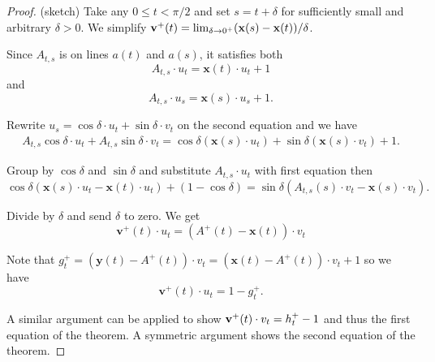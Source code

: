 \begin{proof} (sketch)
Take any $0 \leq t < \pi / 2$ and set $s = t + \delta$ for sufficiently small and arbitrary $\delta > 0$. We simplify $\mathbf{v}^+(t) = \lim_{\delta \rightarrow 0^+}(\mathbf{x}(s) - \mathbf{x}(t)) / \delta$.
	
Since $A_{t, s}$ is on lines $a(t)$ and $a(s)$, it satisfies both 
	$$A_{t, s} \cdot u_t = \mathbf{x}(t) \cdot u_t + 1$$ 
and 
	$$A_{t, s} \cdot u_s = \mathbf{x}(s) \cdot u_s + 1.$$
		
	Rewrite $u_s = \cos \delta \cdot u_t + \sin \delta \cdot v_t$ on the second equation and we have
	\begin{align*}
		A_{t, s} \cos \delta \cdot u_t + A_{t, s} \sin \delta \cdot v_t =  	\cos \delta (\mathbf{x}(s) \cdot u_t) + \sin \delta (\mathbf{x}(s) \cdot v_t) + 1.
	\end{align*}
	
	Group by $\cos \delta$ and $\sin \delta$ and substitute $A_{t, s} \cdot u_t$ with first equation then
	$$ \cos \delta (\mathbf{x}(s) \cdot u_t - \mathbf{x}(t) \cdot u_t) + (1 - \cos \delta)
	= \sin \delta (A_{t, s}  (s) \cdot v_t - \mathbf{x}(s) \cdot v_t) .
	$$
	
	Divide by $\delta$ and send $\delta$ to zero. We get
	$$ \mathbf{v}^+(t) \cdot u_t  = (A^+(t) - \mathbf{x}(t)) \cdot v_t$$
	
	Note that $g_t^+ = (\mathbf{y}(t) - A^+(t)) \cdot v_t = (\mathbf{x}(t) - A^+(t))\cdot v_t + 1$ so
	we have 
	$$ \mathbf{v}^+(t) \cdot u_t = 1 - g_t ^+.$$
	
	A similar argument can be applied to show $\mathbf{v}^+(t) \cdot v_t = h_t^+ - 1$ and thus the first equation of the theorem. 
	A symmetric argument shows the second equation of the theorem.
\end{proof}
